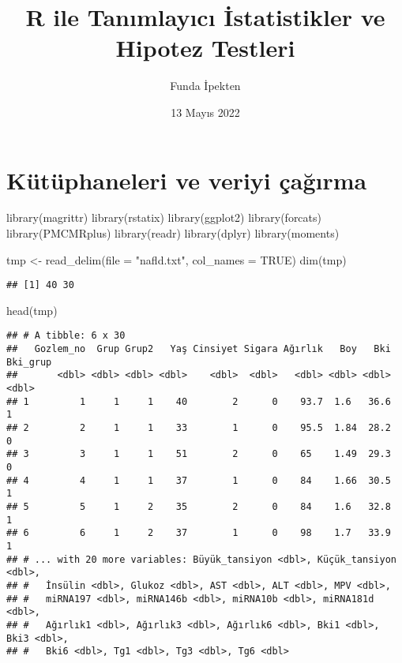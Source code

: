 \documentclass[
]{article}
\title{R ile Tanımlayıcı İstatistikler ve Hipotez Testleri}
\author{Funda İpekten}
\date{13 Mayıs 2022}
\newenvironment{Shaded}{\begin{snugshade}}{\end{snugshade}}
\newcommand{\AttributeTok}[1]{\textcolor[rgb]{0.77,0.63,0.00}{#1}}
\newcommand{\ConstantTok}[1]{\textcolor[rgb]{0.00,0.00,0.00}{#1}}
\newcommand{\FunctionTok}[1]{\textcolor[rgb]{0.00,0.00,0.00}{#1}}
\newcommand{\NormalTok}[1]{#1}
\newcommand{\OtherTok}[1]{\textcolor[rgb]{0.56,0.35,0.01}{#1}}
\newcommand{\StringTok}[1]{\textcolor[rgb]{0.31,0.60,0.02}{#1}}
\begin{document}
\maketitle

\hypertarget{kuxfctuxfcphaneleri-ve-veriyi-uxe7aux11fux131rma}{%
\section{Kütüphaneleri ve veriyi
çağırma}\label{kuxfctuxfcphaneleri-ve-veriyi-uxe7aux11fux131rma}}

\begin{Shaded}
\begin{Highlighting}[]
\FunctionTok{library}\NormalTok{(magrittr)}
\FunctionTok{library}\NormalTok{(rstatix)}
\FunctionTok{library}\NormalTok{(ggplot2)}
\FunctionTok{library}\NormalTok{(forcats)}
\FunctionTok{library}\NormalTok{(PMCMRplus)}
\FunctionTok{library}\NormalTok{(readr) }
\FunctionTok{library}\NormalTok{(dplyr)}
\FunctionTok{library}\NormalTok{(moments)}
\end{Highlighting}
\end{Shaded}

\begin{Shaded}
\begin{Highlighting}[]
\NormalTok{tmp }\OtherTok{\textless{}{-}} \FunctionTok{read\_delim}\NormalTok{(}\AttributeTok{file =} \StringTok{"nafld.txt"}\NormalTok{, }\AttributeTok{col\_names =} \ConstantTok{TRUE}\NormalTok{)}
\FunctionTok{dim}\NormalTok{(tmp)}
\end{Highlighting}
\end{Shaded}

\begin{verbatim}
## [1] 40 30
\end{verbatim}

\begin{Shaded}
\begin{Highlighting}[]
\FunctionTok{head}\NormalTok{(tmp)}
\end{Highlighting}
\end{Shaded}

\begin{verbatim}
## # A tibble: 6 x 30
##   Gozlem_no  Grup Grup2   Yaş Cinsiyet Sigara Ağırlık   Boy   Bki Bki_grup
##       <dbl> <dbl> <dbl> <dbl>    <dbl>  <dbl>   <dbl> <dbl> <dbl>    <dbl>
## 1         1     1     1    40        2      0    93.7  1.6   36.6        1
## 2         2     1     1    33        1      0    95.5  1.84  28.2        0
## 3         3     1     1    51        2      0    65    1.49  29.3        0
## 4         4     1     1    37        1      0    84    1.66  30.5        1
## 5         5     1     2    35        2      0    84    1.6   32.8        1
## 6         6     1     2    37        1      0    98    1.7   33.9        1
## # ... with 20 more variables: Büyük_tansiyon <dbl>, Küçük_tansiyon <dbl>,
## #   İnsülin <dbl>, Glukoz <dbl>, AST <dbl>, ALT <dbl>, MPV <dbl>,
## #   miRNA197 <dbl>, miRNA146b <dbl>, miRNA10b <dbl>, miRNA181d <dbl>,
## #   Ağırlık1 <dbl>, Ağırlık3 <dbl>, Ağırlık6 <dbl>, Bki1 <dbl>, Bki3 <dbl>,
## #   Bki6 <dbl>, Tg1 <dbl>, Tg3 <dbl>, Tg6 <dbl>
\end{verbatim}
\end{document}
